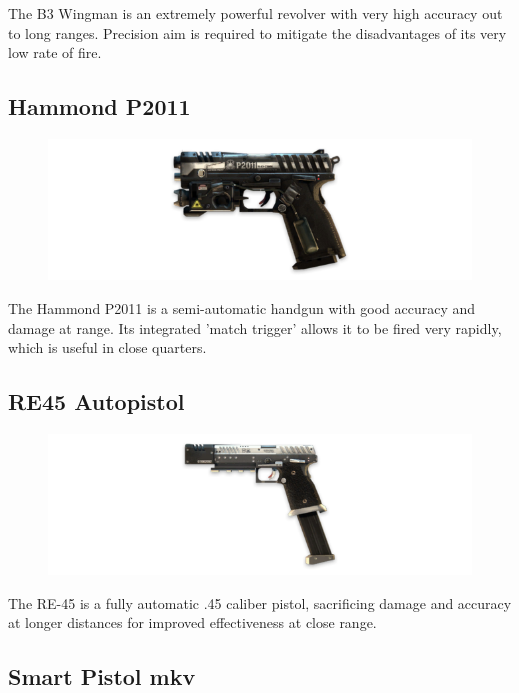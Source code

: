 \documentclass[9pt, openany]{extbook}
\begin{document}
The B3 Wingman is an extremely powerful revolver with very high accuracy out to long ranges. Precision aim is required to mitigate the disadvantages of its very low rate of fire. 

\subsection{Hammond P2011}

\begin{figure}
\vspace*{-2em}
\includegraphics[width=\linewidth]{HammondP2011}
\end{figure}

The Hammond P2011 is a semi-automatic handgun with good accuracy and damage at range. Its integrated 'match trigger' allows it to be fired very rapidly, which is useful in close quarters. 

\subsection{RE45 Autopistol}

\begin{figure}
\vspace*{-2em}
\includegraphics[width=\linewidth]{RE45Autopistol}
\end{figure}


The RE-45 is a fully automatic .45 caliber pistol, sacrificing damage and accuracy at longer distances for improved effectiveness at close range.

\subsection{Smart Pistol mkv}
\end{document}
